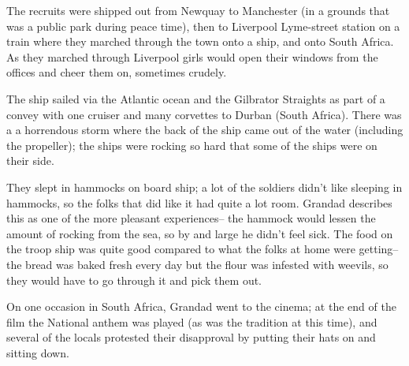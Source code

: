 \documentclass[11pt]{article}
\begin{document}
The recruits were shipped out from Newquay to Manchester (in a grounds that was a public park during peace 
time), then to Liverpool Lyme-street station on a train where they marched through the town onto a ship, 
and onto South Africa.  As they marched through Liverpool girls would open their windows from the offices and 
cheer them on, sometimes crudely.

The ship sailed via the Atlantic ocean and the Gilbrator Straights as part of a convey with one cruiser and many corvettes to Durban (South Africa).
There was a a horrendous storm where the back of the ship came out of the water (including the propeller);
the ships were rocking so hard that some of the ships were on their side.

They slept in hammocks on board ship; a lot of the soldiers
didn't like sleeping in hammocks, so the folks that did like it had quite a lot room. Grandad describes this as 
one of the more pleasant experiences-- the hammock would lessen the amount of rocking from the 
sea, so by and large he didn't feel sick. The food on the troop ship was quite good compared 
to what the folks at home were getting-- the bread was baked fresh every day but the flour was 
infested with weevils, so they would have to go through it and pick them out.

\begin{figure}
  \centering
\end{figure}
On one occasion in South Africa, Grandad went to the cinema; at the end of the film 
the National anthem was played (as was the tradition at this time), and several of the 
locals protested their disapproval by putting their hats on and sitting down.
\end{document}
